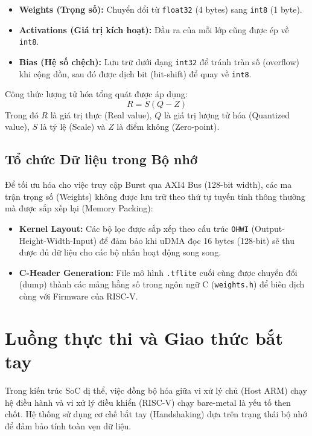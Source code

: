 \begin{itemize}
    \item \textbf{Weights (Trọng số):} Chuyển đổi từ \texttt{float32} (4 bytes) sang \texttt{int8} (1 byte).
    \item \textbf{Activations (Giá trị kích hoạt):} Đầu ra của mỗi lớp cũng được ép về \texttt{int8}.
    \item \textbf{Bias (Hệ số chệch):} Lưu trữ dưới dạng \texttt{int32} để tránh tràn số (overflow) khi cộng dồn, sau đó được dịch bit (bit-shift) để quay về \texttt{int8}.
\end{itemize}

Công thức lượng tử hóa tổng quát được áp dụng:
\begin{equation}
    R = S(Q - Z)
\end{equation}
Trong đó $R$ là giá trị thực (Real value), $Q$ là giá trị lượng tử hóa (Quantized value), $S$ là tỷ lệ (Scale) và $Z$ là điểm không (Zero-point).

\subsection{Tổ chức Dữ liệu trong Bộ nhớ}
Để tối ưu hóa cho việc truy cập Burst qua AXI4 Bus (128-bit width), các ma trận trọng số (Weights) không được lưu trữ theo thứ tự tuyến tính thông thường mà được sắp xếp lại (Memory Packing):
\begin{itemize}
    \item \textbf{Kernel Layout:} Các bộ lọc được sắp xếp theo cấu trúc \texttt{OHWI} 
    (Output-Height-Width-Input) để đảm bảo khi uDMA đọc 16 bytes (128-bit) sẽ thu được 
    đủ dữ liệu cho các bộ nhân hoạt động song song.
    \item \textbf{C-Header Generation:} File mô hình \texttt{.tflite} cuối cùng được
     chuyển đổi (dump) thành các mảng hằng số trong ngôn ngữ C (\texttt{weights.h})
      để biên dịch cùng với Firmware của RISC-V.
\end{itemize}

\section{Luồng thực thi và Giao thức bắt tay}
\label{sec:system_flow}

Trong kiến trúc SoC dị thể, việc đồng bộ hóa giữa vi xử lý chủ (Host ARM) chạy hệ điều hành và vi xử lý điều khiển (RISC-V) chạy bare-metal là yếu tố then chốt. Hệ thống sử dụng cơ chế bắt tay (Handshaking) dựa trên trạng thái bộ nhớ để đảm bảo tính toàn vẹn dữ liệu.

